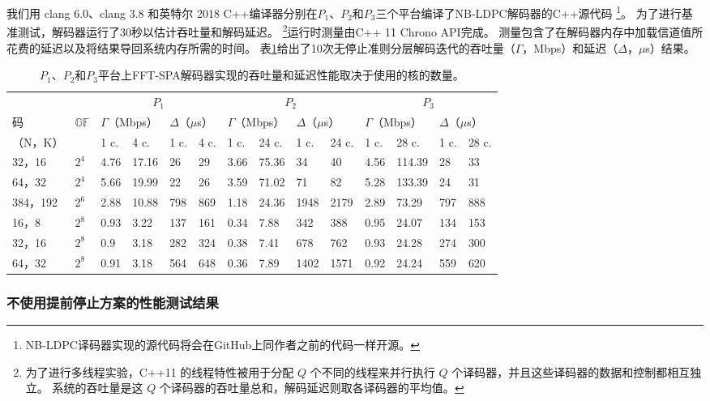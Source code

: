 \documentclass{cjc}
\begin{document}
  我们用 clang 6.0、clang 3.8 和英特尔 2018 C++编译器分别在$P_1$、$P_2$和$P_3$三个平台编译了NB-LDPC解码器的C++源代码
  \footnote{NB-LDPC译码器实现的源代码将会在GitHub上同作者之前的代码一样开源。}。
  为了进行基准测试，解码器运行了30秒以估计吞吐量和解码延迟。
  \footnote{为了进行多线程实验，C++11 的线程特性被用于分配 $Q$ 个不同的线程来并行执行 $Q$ 个译码器，并且这些译码器的数据和控制都相互独立。
  系统的吞吐量是这 $Q$ 个译码器的吞吐量总和，解码延迟则取各译码器的平均值。}运行时测量由C++ 11 Chrono API完成。
  测量包含了在解码器内存中加载信道值所花费的延迟以及将结果导回系统内存所需的时间。
  表\ref{tab:3}给出了10次无停止准则分层解码迭代的吞吐量（$\Gamma$，Mbps）和延迟（$\Delta$，$\mu$s）结果。

\begin{table}[htb]
  \caption{$P_1$、$P_2$和$P_3$平台上FFT-SPA解码器实现的吞吐量和延迟性能取决于使用的核的数量。}
  \label{tab:3}
  \centering
  \begin{tabular}{llllllllllllll}
    \toprule
    &&\multicolumn{4}{c}{$P_1$}&\multicolumn{4}{c}{$P_2$}&\multicolumn{4}{c}{$P_3$}\\
    码&$\mathbb{GF}$&\multicolumn{2}{l}{$\Gamma$（Mbps）}&\multicolumn{2}{l}{$\Delta$（$\mu$s）}&\multicolumn{2}{l}{$\Gamma$（Mbps）}&\multicolumn{2}{l}{$\Delta$（$\mu$s）}&\multicolumn{2}{l}{$\Gamma$（Mbps）}&\multicolumn{2}{l}{$\Delta$（$\mu$s）}\\
    \cmidrule(r){3-4}\cmidrule(r){5-6}\cmidrule(r){7-8}\cmidrule(r){9-10}\cmidrule(r){11-12}\cmidrule(r){13-14}%
    （N，K）&&1 c.&4 c.&1 c.&4 c.&1 c.&24 c.&1 c.&24 c.&1 c.&28 c.&1 c.&28 c.\\
    \midrule
    32，16&$2^4$&4.76&17.16&26&29&3.66&75.36&34&40&4.56&114.39&28&33\\
    64，32&$2^4$&5.66&19.99&22&26&3.59&71.02&71&82&5.28&133.39&24&31\\
    384，192&$2^6$&2.88&10.88&798&869&1.18&24.36&1948&2179&2.89&73.29&797&888\\
    16，8&$2^8$&0.93&3.22&137&161&0.34&7.88&342&388&0.95&24.07&134&153\\
    32，16&$2^8$&0.9&3.18&282&324&0.38&7.41&678&762&0.93&24.28&274&300\\
    64，32&$2^8$&0.91&3.18&564&648&0.36&7.89&1402&1571&0.92&24.24&559&620\\
    \bottomrule
  \end{tabular}
\end{table}

\subsubsection{不使用提前停止方案的性能测试结果}
\end{document}
